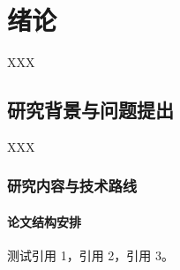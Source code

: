 
\chapter{绪论}
XXX
\section{研究背景与问题提出}
XXX
\subsection{研究内容与技术路线}
\subsubsection{论文结构安排}
测试引用 1\cite{周融2003}，引用 2\cite{图书馆,李大伦1998,伍蠡甫,张筑生}，引用 3\cite{冯西桥1998,姜锡洲,gbt7714_2006,科学技术期刊管理办法,中国大学学报论文文摘,DUBAR2013--,FOURNEY}。

